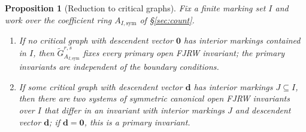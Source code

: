 \documentclass[11pt]{amsart}
\newtheorem{proposition}[theorem]{Proposition}
\theoremstyle{definition}
\theoremstyle{remark}
\begin{document}
\begin{proposition}[Reduction to critical graphs]
\label{prop:reduction}
Fix a finite marking set $I$ and work over the coefficient ring
$A_{I,\mathrm{sym}}$ of \S\ref{sec:count}.
\begin{enumerate}
\item[(a)] If no critical graph with descendent vector $\mathbf0$ has interior
markings contained in $I$, then
$\widetilde G^{r,s}_{A_{I,\mathrm{sym}}}$ fixes every primary open FJRW
invariant; the primary invariants are independent of the boundary
conditions.
\item[(b)] If some critical graph with descendent vector $\mathbf d$ has
interior markings $J\subseteq I$, then there are two systems of symmetric
canonical open FJRW invariants over $I$ that differ in an invariant with interior markings $J$ and
descendent vector $\mathbf d$; if $\mathbf d=\mathbf 0$, this is a primary
invariant.
\end{enumerate}
\end{proposition}
\end{document}
